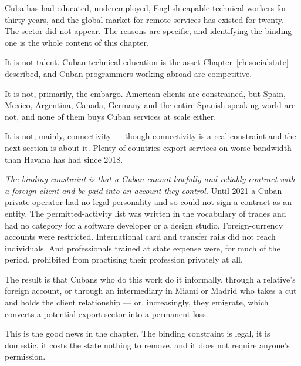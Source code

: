 Cuba has had educated, underemployed, English-capable technical workers for
thirty years, and the global market for remote services has existed for twenty.
The sector did not appear. The reasons are specific, and identifying the binding
one is the whole content of this chapter.

It is not talent. Cuban technical education is the asset Chapter~\ref{ch:socialstate}
described, and Cuban programmers working abroad are competitive.

It is not, primarily, the embargo. American clients are constrained, but Spain,
Mexico, Argentina, Canada, Germany and the entire Spanish-speaking world are
not, and none of them buys Cuban services at scale either.

It is not, mainly, connectivity --- though connectivity is a real constraint and
the next section is about it. Plenty of countries export services on worse
bandwidth than Havana has had since 2018.

\emph{The binding constraint is that a Cuban cannot lawfully and reliably
contract with a foreign client and be paid into an account they control.} Until
2021 a Cuban private operator had no legal personality and so could not sign a
contract as an entity. The permitted-activity list was written in the vocabulary
of trades and had no category for a software developer or a design studio.
Foreign-currency accounts were restricted. International card and transfer rails
did not reach individuals. And professionals trained at state expense were, for
much of the period, prohibited from practising their profession privately at all.

The result is that Cubans who do this work do it informally, through a relative's
foreign account, or through an intermediary in Miami or Madrid who takes a cut
and holds the client relationship --- or, increasingly, they emigrate, which
converts a potential export sector into a permanent loss.

This is the good news in the chapter. The binding constraint is legal, it is
domestic, it costs the state nothing to remove, and it does not require anyone's
permission.

